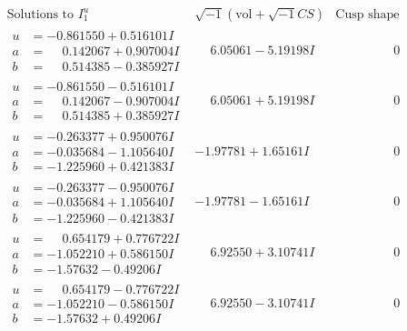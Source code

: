 \documentclass[1p]{elsarticle_modified}
\theoremstyle{definition}
\newcommand{\I}{\sqrt{-1}}
\begin{document}
$$\begin{array}{c|c|c}  
\text{Solutions to }I^u_{1}& \I (\text{vol} + \sqrt{-1}CS) & \text{Cusp shape}\\
 \hline 
\begin{aligned}
u &= -0.861550 + 0.516101 I \\
a &= \phantom{-}0.142067 + 0.907004 I \\
b &= \phantom{-}0.514385 - 0.385927 I\end{aligned}
 & \phantom{-}6.05061 - 5.19198 I & \phantom{-0.000000 } 0 \\ \hline\begin{aligned}
u &= -0.861550 - 0.516101 I \\
a &= \phantom{-}0.142067 - 0.907004 I \\
b &= \phantom{-}0.514385 + 0.385927 I\end{aligned}
 & \phantom{-}6.05061 + 5.19198 I & \phantom{-0.000000 } 0 \\ \hline\begin{aligned}
u &= -0.263377 + 0.950076 I \\
a &= -0.035684 - 1.105640 I \\
b &= -1.225960 + 0.421383 I\end{aligned}
 & -1.97781 + 1.65161 I & \phantom{-0.000000 } 0 \\ \hline\begin{aligned}
u &= -0.263377 - 0.950076 I \\
a &= -0.035684 + 1.105640 I \\
b &= -1.225960 - 0.421383 I\end{aligned}
 & -1.97781 - 1.65161 I & \phantom{-0.000000 } 0 \\ \hline\begin{aligned}
u &= \phantom{-}0.654179 + 0.776722 I \\
a &= -1.052210 + 0.586150 I \\
b &= -1.57632 - 0.49206 I\end{aligned}
 & \phantom{-}6.92550 + 3.10741 I & \phantom{-0.000000 } 0 \\ \hline\begin{aligned}
u &= \phantom{-}0.654179 - 0.776722 I \\
a &= -1.052210 - 0.586150 I \\
b &= -1.57632 + 0.49206 I\end{aligned}
 & \phantom{-}6.92550 - 3.10741 I & \phantom{-0.000000 } 0 \\ \hline\begin{aligned}

\end{aligned}
\end{array}$$
\end{document}
